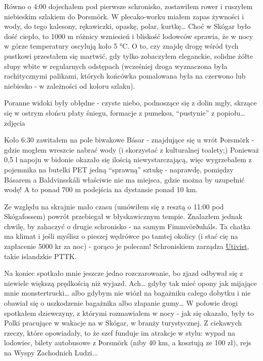 Równo o 4:00 dojechałem pod pierwsze schronisko, zostawiłem rower i ruszyłem niebieskim szlakiem do Þorsmörk. W plecako-worku miałem zapas żywności i wody, do tego kalesony, rękawiczki, opaskę, polar, kurtkę… Choć w Skógar było dość ciepło, to 1000 m różnicy wzniesień i bliskość lodowców sprawia, że w nocy w górze temperatury oscylują koło 5 °C. O to, czy znajdę drogę wśród tych pustkowi przestałem się martwić, gdy tylko zobaczyłem eleganckie, solidne żółte słupy wbite w regularnych odstępach (wcześniej droga wyznaczona była rachitycznymi palikami, których końcówka pomalowana była na czerwono lub niebiesko - w zależności od koloru szlaku).

Poranne widoki były obłędne - czyste niebo, podnoszące się z dolin mgły, skrzące się w ostrym słońcu płaty śniegu, formacje z pumeksu, “pustynie” z popiołu… {zdjęcia}

Koło 6:30 zawitałem na pole biwakowe Básar - znajdujące się u wrót Þorsmörk - gdzie mogłem wreszcie nabrać wody (i skorzystać z kulturalnej toalety;) Ponieważ 0,5 l napoju w bidonie okazało się ilością niewystarczającą, więc wygrzebałem z pojemnika na butelki PET jedną “sprawną” sztukę - naprawdę, pomiędzy Básarem a Baldvinsskáli właściwie nie ma miejsca, gdzie można by uzupełnić wodę! A to ponad 700 m podejścia na dystansie ponad 10 km.

Ze względu na skrajnie mało czasu (umówiłem się z resztą o 11:00 pod Skógafossem) powrót przebiegał w błyskawicznym tempie. Znalazłem jednak chwilę, by zahaczyć o drugie schronisko - na samym Fimmvörðuháls. Ta chatka ma klimat i jeśli myślisz o pieszej wędrówce po tamtej okolicy (i stać cię na zapłacenie 5000 kr za noc) - gorąco je polecam! Schroniskiem zarządza \href{http://www.utivist.is/english}{Utivist}, takie islandzkie PTTK.

Na koniec spotkało mnie jeszcze jedno rozczarowanie, bo zjazd odbywał się z niewiele większą prędkością niż wyjazd. Ach… gdyby tak mieć opony jak mijające mnie monstertrucki… albo gdybym nie wiózł na bagażniku całego dobytku i nie obawiał się o uszkodzenie bagażnika albo złapanie gumy… W połowie drogi spotkałem dziewczyny, z którymi rozmawiałem w nocy - jak się okazało, były to Polki pracujące w wakacje na w Skógar, w branży turystycznej. Z ciekawych rzeczy, które opowiadały, to że szef funduje im atrakcje w stylu: wypad na lodowiec, bilety autobusowe z Þorsmörk (niby 40 km, a kosztują ze 100 zł), rejs na Wyspy Zachodnich Ludzi...


